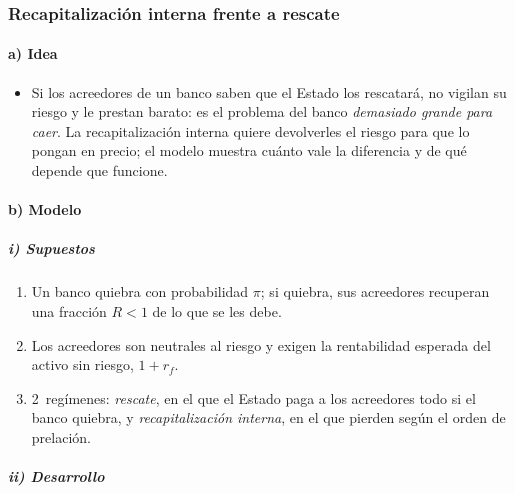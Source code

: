 \documentclass[11pt]{article}
\begin{document}
\subsubsection{Recapitalización interna frente a rescate}\label{sec:bail-in}

\paragraph{a) Idea}

\begin{itemize}
\item Si los acreedores de un banco saben que el Estado los rescatará, no vigilan su riesgo y le prestan barato: es el problema del banco \emph{demasiado grande para caer}. La recapitalización interna quiere devolverles el riesgo para que lo pongan en precio; el modelo muestra cuánto vale la diferencia y de qué depende que funcione.
\end{itemize}

\paragraph{b) Modelo}

\subparagraph{i) Supuestos}

\begin{enumerate}
\item Un banco quiebra con probabilidad $\pi$; si quiebra, sus acreedores recuperan una fracción $R<1$ de lo que se les debe.
\item Los acreedores son neutrales al riesgo y exigen la rentabilidad esperada del activo sin riesgo, $1+r_f$.
\item 2~regímenes: \emph{rescate}, en el que el Estado paga a los acreedores todo si el banco quiebra, y \emph{recapitalización interna}, en el que pierden según el orden de prelación.
\end{enumerate}

\subparagraph{ii) Desarrollo}
\end{document}
